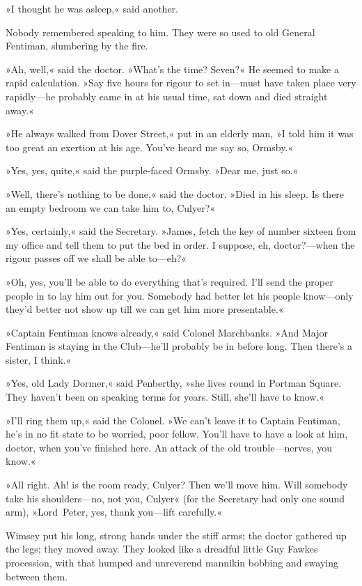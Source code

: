 »I thought he was asleep,« said another.

Nobody remembered speaking to him. They were so used to old General Fentiman, slumbering by the fire.

»Ah, well,« said the doctor. »What's the time? Seven?« He seemed to make a rapid calculation. »Say five hours for rigour to set in—must have taken place very rapidly—he probably came in at his usual time, sat down and died straight away.«

»He always walked from Dover Street,« put in an elderly man, »I told him it was too great an exertion at his age. You've heard me say so, Ormsby.«

»Yes, yes, quite,« said the purple-faced Ormsby. »Dear me, just so.«

»Well, there's nothing to be done,« said the doctor. »Died in his sleep. Is there an empty bedroom we can take him to, Culyer?«

»Yes, certainly,« said the Secretary. »James, fetch the key of number sixteen from my office and tell them to put the bed in order. I suppose, eh, doctor?—when the rigour passes off we shall be able to—eh?«

»Oh, yes, you'll be able to do everything that's required. I'll send the proper people in to lay him out for you. Somebody had better let his people know—only they'd better not show up till we can get him more presentable.«

»Captain Fentiman knows already,« said Colonel Marchbanks. »And Major Fentiman is staying in the Club—he'll probably be in before long. Then there's a sister, I think.«

»Yes, old Lady Dormer,« said Penberthy, »she lives round in Portman Square. They haven't been on speaking terms for years. Still, she'll have to know.«

»I'll ring them up,« said the Colonel. »We can't leave it to Captain Fentiman, he's in no fit state to be worried, poor fellow. You'll have to have a look at him, doctor, when you've finished here. An attack of the old trouble—nerves, you know.«

»All right. Ah! is the room ready, Culyer? Then we'll move him. Will somebody take his shoulders—no, not you, Culyer« (for the Secretary had only one sound arm), »Lord~Peter, yes, thank you—lift carefully.«

Wimsey put his long, strong hands under the stiff arms; the doctor gathered up the legs; they moved away. They looked like a dreadful little Guy Fawkes procession, with that humped and unreverend mannikin bobbing and swaying between them.

